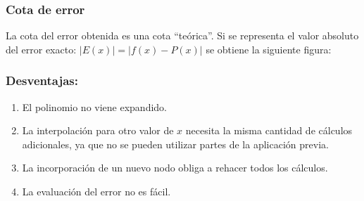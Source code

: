 \documentclass[10pt]{beamer}
\begin{document}
{
\frametitle{Cota de error}
La cota del error obtenida es una cota ``te\'orica''. Si se representa el valor absoluto del error exacto: $|E(x) | = | f(x) - P(x)|$ se obtiene la siguiente figura:
}
\frame
{
\frametitle{Desventajas:}
\begin{enumerate}
 \item<1-> El polinomio no viene expandido.
 \item<2-> La interpolaci\'on para otro valor de $x$ necesita la misma cantidad de c\'alculos adicionales, ya que no se pueden utilizar partes de la aplicaci\'on previa.
 \item<3-> La incorporaci\'on de un nuevo nodo obliga a rehacer todos los c\'alculos.
 \item<4-> La evaluaci\'on del error no es f\'acil.
\end{enumerate}
}
\frame
\end{document}
